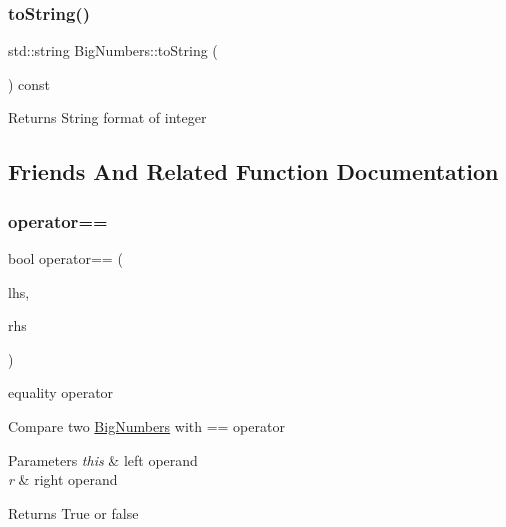 \subsubsection{\texorpdfstring{toString()}{toString()}}
{\footnotesize\ttfamily std\+::string Big\+Numbers\+::to\+String (\begin{DoxyParamCaption}{ }\end{DoxyParamCaption}) const}

\begin{DoxyReturn}{Returns}
String format of integer 
\end{DoxyReturn}


\subsection{Friends And Related Function Documentation}
\mbox{\label{classBigNumbers_a8ed2f27b8f4605f1afb4b11133d9883f}} 
\subsubsection{\texorpdfstring{operator==}{operator==}}
{\footnotesize\ttfamily bool operator== (\begin{DoxyParamCaption}\item[{const \mbox{\hyperlink{classBigNumbers}{Big\+Numbers}} \&}]{lhs,  }\item[{const \mbox{\hyperlink{classBigNumbers}{Big\+Numbers}} \&}]{rhs }\end{DoxyParamCaption})\hspace{0.3cm}{\ttfamily [friend]}}

equality operator

Compare two \mbox{\hyperlink{classBigNumbers}{Big\+Numbers}} with == operator 
\begin{DoxyParams}{Parameters}
{\em this} & left operand \\
\hline
{\em r} & right operand \\
\hline
\end{DoxyParams}
\begin{DoxyReturn}{Returns}
True or false 
\end{DoxyReturn}
\mbox{\label{classBigNumbers_a15eeb03216484ee82af39f6934e0827f}} 
